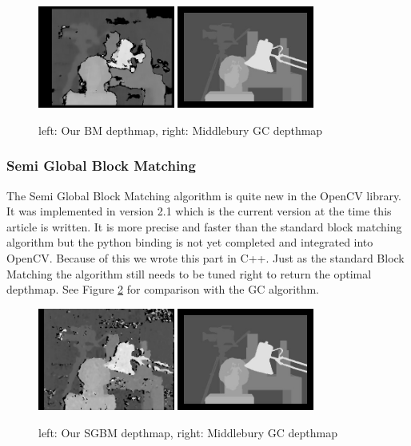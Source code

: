 \documentclass[a4paper]{article}
\begin{document}
\begin{figure} [h!tb]
  \centering
  \includegraphics[width=0.4\textwidth]{bm_tsukuba_own}
  \includegraphics[width=0.4\textwidth]{disp_tsukuba_orig}
  \caption{left: Our BM depthmap, right: Middlebury GC depthmap}
  \label{bm_comp}
\end{figure}

\subsubsection{Semi Global Block Matching}
The Semi Global Block Matching algorithm is quite new in the OpenCV
library. It was implemented in version 2.1 which is the current
version at the time this article is written. It is more precise and
faster than the standard block matching algorithm but the python
binding is not yet completed and integrated into OpenCV. Because of
this we wrote this part in C++. Just as the standard Block Matching
the algorithm still needs to be tuned right to return the optimal
depthmap. See Figure \ref{sgbm_comp} for comparison with the GC
algorithm.

\begin{figure} [h!tb]
  \centering
  \includegraphics[width=0.4\textwidth]{sgbm_tsukuba_own}
  \includegraphics[width=0.4\textwidth]{disp_tsukuba_orig}
  \caption{left: Our SGBM depthmap, right: Middlebury GC depthmap}
  \label{sgbm_comp}
\end{figure}
\end{document}
